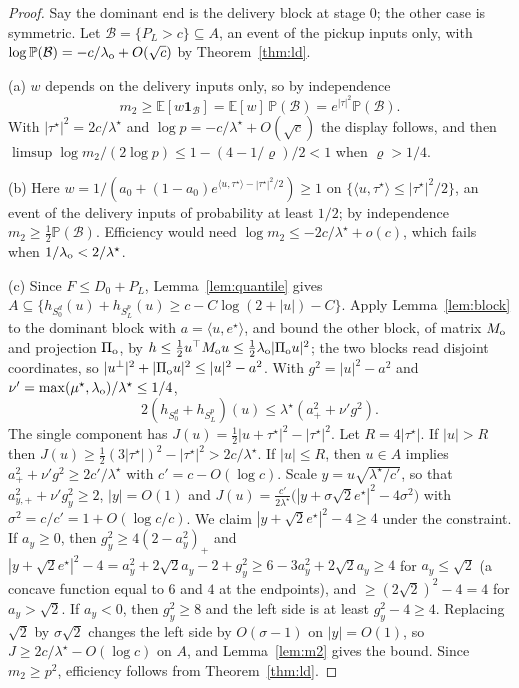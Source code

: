 \documentclass[pdflatex,sn-mathphys-ay]{sn-jnl}%
\theoremstyle{thmstyleone}%
\theoremstyle{thmstylethree}%
\theoremstyle{thmstyletwo}%
\newcommand{\E}{\mathbb{E}}
\renewcommand{\P}{\mathbb{P}}
\newcommand{\one}{\mathbf{1}}
\newcommand{\ip}[2]{\langle #1,#2\rangle}
\begin{document}
\begin{proof}
Say the dominant end is the delivery block at stage $0$; the other case is symmetric. Let
$\mathcal{B}=\{P_L>c\}\subseteq A$, an event of the pickup inputs only, with
$\log\P(\mathcal{B})=-c/\lambda_{\rm o}+O(\sqrt c)$ by Theorem~\ref{thm:ld}.

(a) $w$ depends on the delivery inputs only, so by independence
\[
m_2\ge\E[w\one_{\mathcal{B}}]=\E[w]\,\P(\mathcal{B})=e^{|\tau|^2}\P(\mathcal{B}).
\]
With $|\tau^\star|^2=2c/\lambda^\star$
and $\log p=-c/\lambda^\star+O(\sqrt c)$ the display follows, and then
$\limsup\log m_2/(2\log p)\le1-(4-1/\varrho)/2<1$ when $\varrho>1/4$.

(b) Here $w=1/(a_0+(1-a_0)e^{\ip u{\tau^\star}-|\tau^\star|^2/2})\ge1$ on
$\{\ip u{\tau^\star}\le|\tau^\star|^2/2\}$, an event of the delivery inputs of probability at
least $1/2$; by independence $m_2\ge\frac12\P(\mathcal{B})$. Efficiency would need
$\log m_2\le-2c/\lambda^\star+o(c)$, which fails when $1/\lambda_{\rm o}<2/\lambda^\star$.

(c) Since $F\le D_0+P_L$, Lemma~\ref{lem:quantile} gives
$A\subseteq\{h_{S^d_0}(u)+h_{S^p_L}(u)\ge c-C\log(2+|u|)-C\}$. Apply Lemma~\ref{lem:block}
to the dominant block with $a=\ip u{e^\star}$, and bound the other block, of matrix
$M_{\rm o}$ and projection $\Pi_{\rm o}$, by
$h\le\frac12u^\top M_{\rm o}u\le\frac12\lambda_{\rm o}|\Pi_{\rm o}u|^2$; the two blocks read
disjoint coordinates, so $|u^\perp|^2+|\Pi_{\rm o}u|^2\le|u|^2-a^2$. With $g^2=|u|^2-a^2$ and
$\nu'=\max(\mu^\star,\lambda_{\rm o})/\lambda^\star\le1/4$,
\[
2(h_{S^d_0}+h_{S^p_L})(u)\le\lambda^\star(a_+^2+\nu'g^2).
\]
The single component has $J(u)=\frac12|u+\tau^\star|^2-|\tau^\star|^2$. Let $R=4|\tau^\star|$. If
$|u|>R$ then $J(u)\ge\frac12(3|\tau^\star|)^2-|\tau^\star|^2>2c/\lambda^\star$. If $|u|\le R$,
then $u\in A$ implies $a_+^2+\nu'g^2\ge2c'/\lambda^\star$ with $c'=c-O(\log c)$. Scale
$y=u\sqrt{\lambda^\star/c'}$, so that $a_{y,+}^2+\nu'g_y^2\ge2$, $|y|=O(1)$ and
$J(u)=\frac{c'}{2\lambda^\star}\big(|y+\sigma\sqrt2e^\star|^2-4\sigma^2\big)$ with
$\sigma^2=c/c'=1+O(\log c/c)$. We claim $|y+\sqrt2e^\star|^2-4\ge4$ under the
constraint. If $a_y\ge0$, then $g_y^2\ge4(2-a_y^2)_+$ and
$|y+\sqrt2e^\star|^2-4=a_y^2+2\sqrt2a_y-2+g_y^2\ge6-3a_y^2+2\sqrt2a_y\ge4$ for
$a_y\le\sqrt2$ (a concave function equal to $6$ and $4$ at the endpoints), and
$\ge(2\sqrt2)^2-4=4$ for $a_y>\sqrt2$. If $a_y<0$, then $g_y^2\ge8$ and the left side is
at least $g_y^2-4\ge4$. Replacing $\sqrt2$ by $\sigma\sqrt2$ changes the left side by
$O(\sigma-1)$ on $|y|=O(1)$, so $J\ge2c/\lambda^\star-O(\log c)$ on $A$, and
Lemma~\ref{lem:m2} gives the bound. Since $m_2\ge p^2$, efficiency follows from
Theorem~\ref{thm:ld}.
\end{proof}
\end{document}
